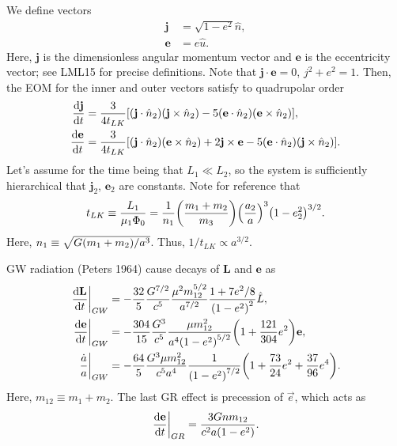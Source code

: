 \documentclass[11pt,
        usenames, %
        dvipsnames %
    ]{article}
\newcommand*{\rd}[2]{\frac{\mathrm{d}#1}{\mathrm{d}#2}}
\newcommand*{\bm}[1]{\boldsymbol{\mathbf{#1}}}
\newcommand*{\at}[1]{\left.#1\right|}
\DeclarePairedDelimiter\p{\lparen}{\rparen}
\DeclarePairedDelimiter\s{\lbrack}{\rbrack}
\begin{document}
We define vectors
\begin{align}
    \bm{j} &= \sqrt{1 - e^2}\hat{n},\\
    \bm{e} &= e\hat{u}.
\end{align}
Here, $\bm{j}$ is the dimensionless angular momentum vector and $\bm{e}$ is the
eccentricity vector; see LML15 for precise definitions. Note that $\bm{j} \cdot
\bm{e} = 0$, $j^2 + e^2 = 1$. Then, the EOM for the inner and outer vectors
satisfy to quadrupolar order
\begin{align}
    \rd{\bm{j}}{t} &= \frac{3}{4t_{LK}} \s*{
        \p*{\bm{j} \cdot \hat{n}_2} \p*{\bm{j} \times \hat{n}_2}
        - 5\p*{\bm{e} \cdot \hat{n}_2}\p*{\bm{e} \times \hat{n}_2}
        },\\
    \rd{\bm{e}}{t} &= \frac{3}{4t_{LK}} \s*{
        \p*{\bm{j} \cdot \hat{n}_2} \p*{\bm{e} \times \hat{n}_2}
        + 2\bm{j} \times \bm{e}
        - 5\p*{\bm{e} \cdot \hat{n}_2}\p*{\bm{j} \times \hat{n}_2}
        }.
\end{align}
Let's assume for the time being that $L_1 \ll L_2$, so the system is
sufficiently hierarchical that $\bm{j}_2$, $\bm{e}_2$ are constants. Note for
reference that
\begin{equation}
    t_{LK} \equiv \frac{L_1}{\mu_1 \Phi_0}
        = \frac{1}{n_1}\p*{\frac{m_1 + m_2}{m_3}}
            \p*{\frac{a_2}{a}}^3
            \p*{1 - e_2^2}^{3/2}.
\end{equation}
Here, $n_1 \equiv \sqrt{G\p*{m_1 + m_2}/a^3}$. Thus, $1 / t_{LK} \propto
a^{3/2}$.

GW radiation (Peters 1964) cause decays of $\bm{L}$ and $\bm{e}$ as
\begin{align}
    \at{\rd{\bm{L}}{t}}_{GW} &= -\frac{32}{5}\frac{G^{7/2}}{c^5}
        \frac{\mu^2 m_{12}^{5/2}}{a^{7/2}}
        \frac{1 + 7e^2/8}{\p*{1 - e^2}^2}\hat{L},\\
    \at{\rd{\bm{e}}{t}}_{GW} &= -\frac{304}{15} \frac{G^3}{c^5}
        \frac{\mu m_{12}^2}{a^4\p*{1 - e^2}^{5/2}}\p*{1 + \frac{121}{304}
            e^2}\bm{e},\\
    \at{\frac{\dot{a}}{a}}_{GW} &= -\frac{64}{5} \frac{G^3 \mu m_{12}^2}{c^5a^4}
        \frac{1}{\p*{1 - e^2}^{7/2}}\p*{1 + \frac{73}{24}e^2
            + \frac{37}{96}e^4}.
\end{align}
Here, $m_{12} \equiv m_1 + m_2$. The last GR effect is precession of $\vec{e}$,
which acts as
\begin{equation}
    \at{\rd{\bm{e}}{t}}_{GR} = \frac{3Gnm_{12}}{c^2a\p*{1 - e^2}}.
\end{equation}
\end{document}
